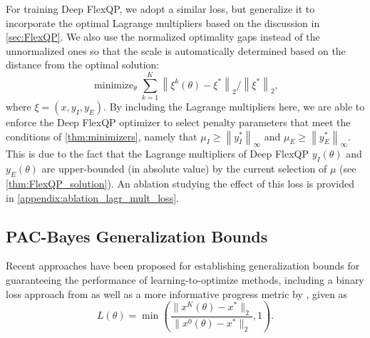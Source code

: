 \documentclass{article} %
\DeclareMathOperator*{\minimize}{minimize}
\newcommand{\norm}[1]{\left\lVert#1\right\rVert}
\begin{document}
For training Deep FlexQP, we adopt a similar loss, but generalize it to incorporate the optimal Lagrange multipliers based on the discussion in \cref{sec:FlexQP}. We also use the normalized optimality gaps instead of the unnormalized ones so that the scale is automatically determined based on the distance from the optimal solution:
\begin{equation} \label{eq:new_supervised_loss}
    \minimize_\theta \sum_{k=1}^K \norm{ \xi^k(\theta) - \xi^*}_2 / \norm{\xi^*}_2,
\end{equation}
where $\xi = (x, y_I, y_E)$.
By including the Lagrange multipliers here, we are able to enforce the Deep FlexQP optimizer to select penalty parameters that meet the conditions of \cref{thm:minimizers}, namely that $\mu_I \geq \norm{y_I^*}_\infty$ and $\mu_E \geq \norm{y_E^*}_\infty$. This is due to the fact that the Lagrange multipliers of Deep FlexQP $y_I(\theta)$ and $y_E(\theta)$ are upper-bounded (in absolute value) by the current selection of $\mu$ (see \cref{thm:FlexQP_solution}). An ablation studying the effect of this loss is provided in \cref{appendix:ablation_lagr_mult_loss}.

\subsection{PAC-Bayes Generalization Bounds}
\label{sec:deep_unfolding:pac_bayes_bounds}

Recent approaches have been proposed for establishing generalization bounds for guaranteeing the performance of learning-to-optimize methods, including a binary loss approach from \cite{sambharya2025data} as well as a more informative progress metric by \citet{saravanos2025deep}, given as
\begin{equation} \label{eq:saravanos_gen_bound_loss}
    L(\theta) = \min\left(\frac{\lVert x^K(\theta) - x^* \rVert_2}{\lVert x^0(\theta) - x^* \rVert_2}, 1\right).
\end{equation}
\end{document}
